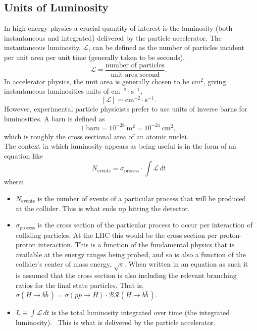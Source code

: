 \subsection{Units of Luminosity}\label{subsection:luminosity_units}
In high energy physics a crucial quantity of interest is the luminosity (both instantaneous and integrated) delivered by the particle accelerator.
The instantaneous luminosity, $\mathscr{L}$, can be defined as the number of particles incident per unit area per unit time (generally taken to be seconds),
\begin{equation}
 \mathscr{L} = \frac{\text{number of particles}}{\text{unit area} \cdot \text{second}}.
 \label{eq:instantaneous_luminosity}
\end{equation}
In accelerator physics, the unit area is generally chosen to be $\textrm{cm}^2$, giving instantaneous luminosities units of $\textrm{cm}^{-2} \cdot \textrm{s}^{-1}$,
\[
 \left[\mathscr{L}\right] = \textrm{cm}^{-2} \cdot \textrm{s}^{-1}.
\]
However, experimental particle physicists prefer to use units of inverse barns for luminosities. A barn is defined as
\begin{equation}
 1~\textrm{barn} = 10^{-28}~\textrm{m}^2 = 10^{-24}~\textrm{cm}^2,
 \label{eq:barn_to_area}
\end{equation}
which is roughly the cross sectional area of an atomic nuclei.~\cite{web:history_physics_purdue,history:etymology_barn}\\

The context in which luminosity appears as being useful is in the form of an equation like
\begin{equation}
 N_{\textrm{events}} = \sigma_{\textrm{process}} \cdot \int \mathscr{L}\,dt
 \label{eq:events_from_luminosity}
\end{equation}
where:
\begin{itemize}
 \item $N_{\text{events}}$ is the number of events of a particular process that will be produced at the collider.
       This is what ends up hitting the detector.
 \item $\sigma_{\textrm{process}}$ is the cross section of the particular process to occur per interaction of colliding particles.
       At the \Gls{LHC} this would be the cross section per proton-proton interaction.
       This is a function of the fundamental physics that is available at the energy ranges being probed, and so is also a function of the collider's center of mass energy, $\sqrt{s}$.
       When written in an equation as such it is assumed that the cross section is also including the relevant branching ratios for the final state particles.
       That is, $\sigma\left(H \to b\bar{b}\,\right) = \sigma\left(pp \to H\right) \cdot \mathcal{BR}\left(H \to b\bar{b}\,\right)$.
 \item $L \equiv \int \mathscr{L}\,dt$ is the total luminosity integrated over time (the integrated luminosity).~\cite{Herr:941318}
       This is what is delivered by the particle accelerator.
\end{itemize}

